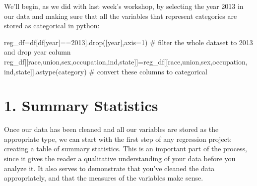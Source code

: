 \documentclass[
  letterpaper,
  DIV=11,
  numbers=noendperiod]{scrreprt}
\newenvironment{Shaded}{\begin{snugshade}}{\end{snugshade}}
\newcommand{\CommentTok}[1]{\textcolor[rgb]{0.37,0.37,0.37}{#1}}
\newcommand{\DecValTok}[1]{\textcolor[rgb]{0.68,0.00,0.00}{#1}}
\newcommand{\NormalTok}[1]{\textcolor[rgb]{0.00,0.23,0.31}{#1}}
\newcommand{\OperatorTok}[1]{\textcolor[rgb]{0.37,0.37,0.37}{#1}}
\newcommand{\StringTok}[1]{\textcolor[rgb]{0.13,0.47,0.30}{#1}}
\begin{document}
We'll begin, as we did with last week's workshop, by selecting the year
2013 in our data and making sure that all the variables that represent
categories are stored as categorical in python:

\begin{Shaded}
\begin{Highlighting}[]
\NormalTok{reg\_df}\OperatorTok{=}\NormalTok{df[df[}\StringTok{\textquotesingle{}year\textquotesingle{}}\NormalTok{]}\OperatorTok{==}\DecValTok{2013}\NormalTok{].drop([}\StringTok{\textquotesingle{}year\textquotesingle{}}\NormalTok{],axis}\OperatorTok{=}\DecValTok{1}\NormalTok{) }\CommentTok{\# filter the whole dataset to 2013 and drop year column}
\NormalTok{reg\_df[[}\StringTok{\textquotesingle{}race\textquotesingle{}}\NormalTok{,}\StringTok{\textquotesingle{}union\textquotesingle{}}\NormalTok{,}\StringTok{\textquotesingle{}sex\textquotesingle{}}\NormalTok{,}\StringTok{\textquotesingle{}occupation\textquotesingle{}}\NormalTok{,}\StringTok{\textquotesingle{}ind\textquotesingle{}}\NormalTok{,}\StringTok{\textquotesingle{}state\textquotesingle{}}\NormalTok{]]}\OperatorTok{=}\NormalTok{reg\_df[[}\StringTok{\textquotesingle{}race\textquotesingle{}}\NormalTok{,}\StringTok{\textquotesingle{}union\textquotesingle{}}\NormalTok{,}\StringTok{\textquotesingle{}sex\textquotesingle{}}\NormalTok{,}\StringTok{\textquotesingle{}occupation\textquotesingle{}}\NormalTok{, }\StringTok{\textquotesingle{}ind\textquotesingle{}}\NormalTok{,}\StringTok{\textquotesingle{}state\textquotesingle{}}\NormalTok{]].astype(}\StringTok{\textquotesingle{}category\textquotesingle{}}\NormalTok{) }\CommentTok{\# convert these columns to categorical}
\end{Highlighting}
\end{Shaded}

\hypertarget{summary-statistics-1}{%
\section{1. Summary Statistics}\label{summary-statistics-1}}

Once our data has been cleaned and all our variables are stored as the
appropriate type, we can start with the first step of any regression
project: creating a table of summary statistics. This is an important
part of the process, since it gives the reader a qualitative
understanding of your data before you analyze it. It also serves to
demonstrate that you've cleaned the data appropriately, and that the
measures of the variables make sense.
\end{document}
